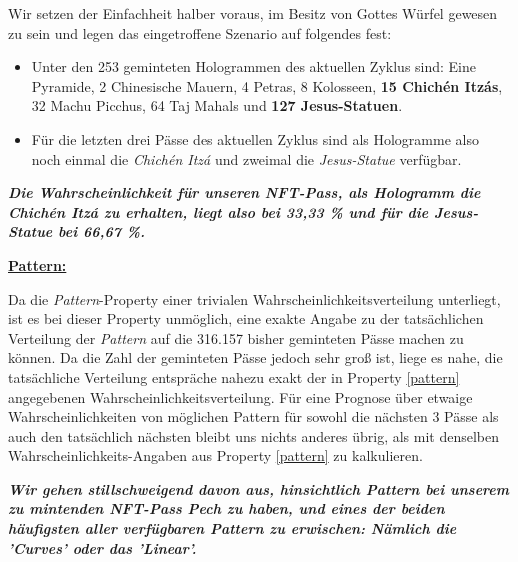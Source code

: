Wir setzen der Einfachheit halber voraus, im Besitz von Gottes Würfel gewesen zu sein und legen das eingetroffene Szenario auf folgendes fest:

\begin{itemize}
  \item Unter den 253 geminteten Hologrammen des aktuellen Zyklus sind: Eine Pyramide, 2 Chinesische Mauern, 4 Petras, 8 Kolosseen, \textbf{15 Chichén Itzás}, 32 Machu Picchus, 64 Taj Mahals und \textbf{127 Jesus-Statuen}.
  \item Für die letzten drei Pässe des aktuellen Zyklus sind als Hologramme also noch einmal die \textit{Chichén Itzá} und zweimal die \textit{Jesus-Statue} verfügbar.
\end{itemize}

\vspace{0.3cm}

\textbf{\textit{Die Wahrscheinlichkeit für unseren NFT-Pass, als Hologramm die Chichén Itzá zu erhalten, liegt also bei 33,33 \% und für die Jesus-Statue bei 66,67 \%.}}


\vspace{1.0cm}


\underline{\textbf{Pattern:}}

\vspace{0.2cm}

Da die \textit{Pattern}-Property einer trivialen Wahrscheinlichkeitsverteilung unterliegt, ist es bei dieser Property unmöglich, eine exakte Angabe zu der tatsächlichen Verteilung der \textit{Pattern} auf die 316.157 bisher geminteten Pässe machen zu können. Da die Zahl der geminteten Pässe jedoch sehr groß ist, liege es nahe, die tatsächliche Verteilung entspräche nahezu exakt der in Property \ref{pattern} angegebenen Wahrscheinlichkeitsverteilung. Für eine Prognose über etwaige Wahrscheinlichkeiten von möglichen Pattern für sowohl die nächsten 3 Pässe als auch den tatsächlich nächsten bleibt uns nichts anderes übrig, als mit denselben Wahrscheinlichkeits-Angaben aus Property \ref{pattern} zu kalkulieren.

\vspace{0.2cm}

\textbf{\textit{Wir gehen stillschweigend davon aus, hinsichtlich Pattern bei unserem zu mintenden NFT-Pass Pech zu haben, und eines der beiden häufigsten aller verfügbaren Pattern zu erwischen: Nämlich die 'Curves' oder das 'Linear'.}}


\vspace{1.0cm}


